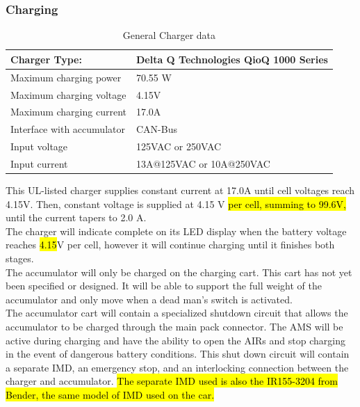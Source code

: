 \documentclass{article}
\DeclareRobustCommand{\hlr}[1]{{\sethlcolor{red}\hl{#1}}}
\begin{document}
        \subsubsection{Charging} \label{charging}


            \begin{table}[H]
                \centering
                \begin{tabular}{|l|l|}
                    \hline
                    Charger Type: & Delta Q Technologies QioQ 1000 Series \\ \hline
                    Maximum charging power & 70.55 W \\ \hline
                    Maximum charging voltage & 4.15V \\ \hline
                    Maximum charging current & 17.0A \\ \hline
                    Interface with accumulator & CAN-Bus \\ \hline
                    Input voltage & 125VAC or 250VAC \\ \hline
                    Input current & 13A@125VAC or 10A@250VAC \\ \hline
                \end{tabular}
                \caption{General Charger data}
                \label{charger}
            \end{table}

            This UL-listed charger supplies constant current at 17.0A until cell voltages reach 4.15V. Then, constant voltage is supplied at 4.15 V \hlr{per cell, summing to 99.6V,} until the current tapers to 2.0 A.\\

            The charger will indicate complete on its LED display when the battery voltage reaches \hlr{4.15}V per cell, however it will continue charging until it finishes both stages.\\

            The accumulator will only be charged on the charging cart. This cart has not yet been specified or designed. It will be able to support the full weight of the accumulator and only move when a dead man's switch is activated.\\

            The accumulator cart will contain a specialized shutdown circuit that allows the accumulator to be charged through the main pack connector. The AMS will be active during charging and have the ability to open the AIRs and stop charging in the event of dangerous battery conditions. This shut down circuit will contain a separate IMD, an emergency stop, and an interlocking connection between the charger and accumulator. \hlr{ The separate IMD used is also the IR155-3204 from Bender, the same model of IMD used on the car.}
\end{document}
